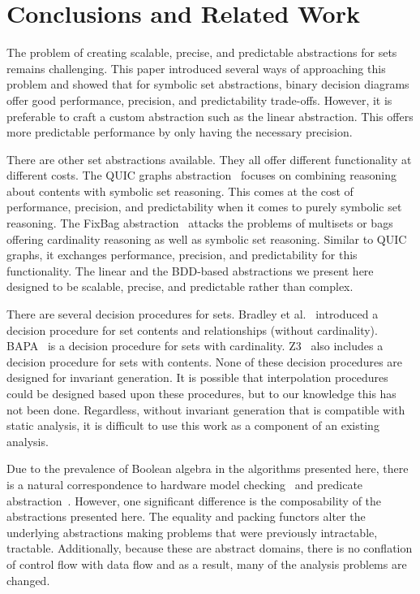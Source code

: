 \section{Conclusions and Related Work}
The problem of creating scalable, precise, and predictable abstractions for sets remains challenging.  This paper introduced several ways of approaching this problem and showed that for symbolic set abstractions, binary decision diagrams offer good performance, precision, and predictability trade-offs.  However, it is preferable to craft a custom abstraction such as the linear abstraction.  This offers more predictable performance by only having the necessary precision.

There are other set abstractions available.  They all offer different functionality at different costs.  The QUIC graphs abstraction~\cite{ab:ecoop:13,quicr:cav:14} focuses on combining reasoning about contents with symbolic set reasoning.  This comes at the cost of performance, precision, and predictability when it comes to purely symbolic set reasoning.  The FixBag abstraction~\cite{fixbag:cav:11} attacks the problems of multisets or bags offering cardinality reasoning as well as symbolic set reasoning.  Similar to QUIC graphs, it exchanges performance, precision, and predictability for this functionality.  The linear and the BDD-based abstractions we present here designed to be scalable, precise, and predictable rather than complex.

There are several decision procedures for sets.  Bradley et al.~\cite{bradley:vmcai:06} introduced a decision procedure for set contents and relationships (without cardinality).  BAPA~\cite{knr:jar:06,jahob:thesis:07} is a decision procedure for sets with cardinality.  Z3~\cite{mb:tacas:08} also includes a decision procedure for sets with contents.  None of these decision procedures are designed for invariant generation.  It is possible that interpolation procedures~\cite{interp:cav:03} could be designed based upon these procedures, but to our knowledge this has not been done.  Regardless, without invariant generation that is compatible with static analysis, it is difficult to use this work as a component of an existing analysis.

Due to the prevalence of Boolean algebra in the algorithms presented here, there is a natural correspondence to hardware model checking~\cite{mc:toplas:86} and predicate abstraction~\cite{sympred:cav:03}.  However, one significant difference is the composability of the abstractions presented here.  The equality and packing functors alter the underlying abstractions making problems that were previously intractable, tractable.  Additionally, because these are abstract domains, there is no conflation of control flow with data flow and as a result, many of the analysis problems are changed.

